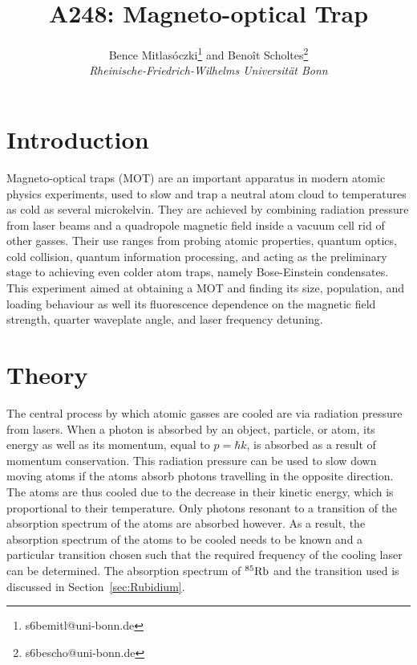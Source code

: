 \documentclass[twocolumn]{article}
\title{\textbf{A248: Magneto-optical Trap}}
\author{Bence Mitlasóczki\thanks{s6bemitl@uni-bonn.de} and Beno\^it Scholtes\thanks{s6bescho@uni-bonn.de} \\ \textit{Rheinische-Friedrich-Wilhelms Universit\"at Bonn}}
\begin{document}
\renewcommand{\abstractname}{\vspace{-\baselineskip}} %
\maketitle
\saythanks %
\section{Introduction}
Magneto-optical traps (MOT) are an important apparatus in modern atomic physics experiments, used to slow and trap a neutral atom cloud to temperatures as cold as several microkelvin. They are achieved by combining radiation pressure from laser beams and a quadropole magnetic field inside a vacuum cell rid of other gasses. Their use ranges from probing atomic properties, quantum optics, cold collision, quantum information processing, and acting as the preliminary stage to achieving even colder atom traps, namely Bose-Einstein condensates. This experiment aimed at obtaining a MOT and finding its size, population, and loading behaviour as well its fluorescence dependence on the magnetic field strength, quarter waveplate angle, and laser frequency detuning.

\section{Theory}
The central process by which atomic gasses are cooled are via radiation pressure from lasers. When a photon is absorbed by an object, particle, or atom, its energy as well as its momentum, equal to $p=\hbar k$, is absorbed as a result of momentum conservation. This radiation pressure can be used to slow down moving atoms if the atoms absorb photons travelling in the opposite direction. The atoms are thus cooled due to the decrease in their kinetic energy, which is proportional to their temperature. Only photons resonant to a transition of the absorption spectrum of the atoms are absorbed however. As a result, the absorption spectrum of the atoms to be cooled needs to be known and a particular transition chosen such that the required frequency of the cooling laser can be determined. The absorption spectrum of $^{85}\ce{Rb}$ and the transition used is discussed in Section~\ref{sec:Rubidium}. \\
\end{document}
